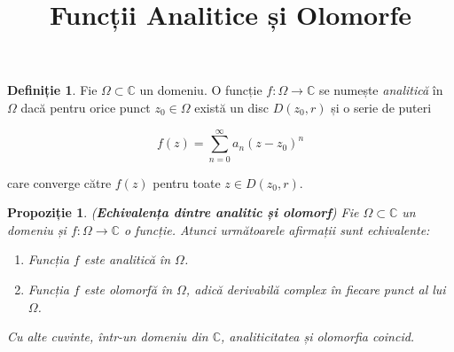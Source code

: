 \documentclass[12pt]{article}
\title{Funcții Analitice și Olomorfe}
\author{}
\date{}
\theoremstyle{definition}
\newtheorem{definition}{Definiție}
\theoremstyle{plain}
\newtheorem{proposition}{Propoziție}
\begin{document}
\maketitle

\begin{definition}
Fie $\Omega \subset \mathbb{C}$ un domeniu.  
O funcție $f:\Omega \to \mathbb{C}$ se numește \emph{analitică} în $\Omega$ dacă pentru orice punct $z_0 \in \Omega$ există un disc $D(z_0,r)$ și o serie de puteri


\[
f(z) = \sum_{n=0}^{\infty} a_n (z - z_0)^n
\]


care converge către $f(z)$ pentru toate $z \in D(z_0,r)$.
\end{definition}

\begin{proposition}
(\textbf{Echivalența dintre analitic și olomorf})  
Fie $\Omega \subset \mathbb{C}$ un domeniu și $f:\Omega \to \mathbb{C}$ o funcție.  
Atunci următoarele afirmații sunt echivalente:
\begin{enumerate}
    \item[(i)] Funcția $f$ este \emph{analitică} în $\Omega$.
    \item[(ii)] Funcția $f$ este \emph{olomorfă} în $\Omega$, adică derivabilă complex în fiecare punct al lui $\Omega$.
\end{enumerate}
Cu alte cuvinte, într-un domeniu din $\mathbb{C}$, analiticitatea și olomorfia coincid.
\end{proposition}
\end{document}
